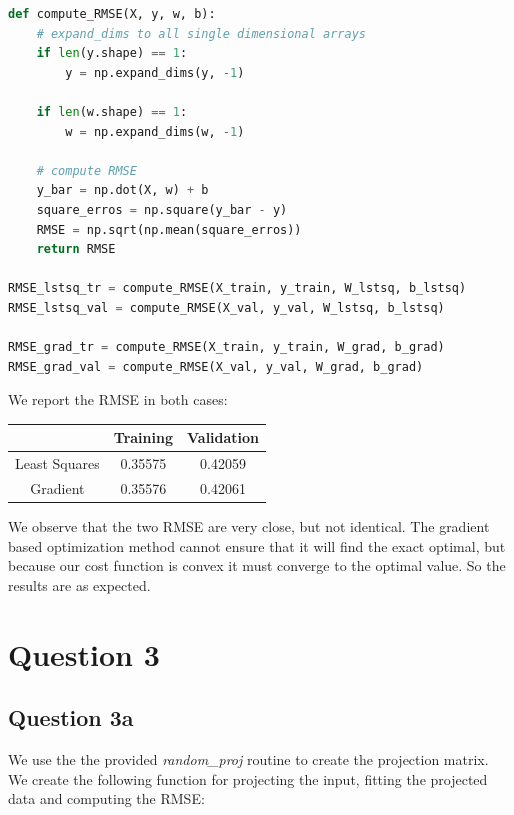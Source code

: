 \documentclass{article}
\begin{document}
\begin{lstlisting}[language= Python]
def compute_RMSE(X, y, w, b):
    # expand_dims to all single dimensional arrays
    if len(y.shape) == 1:
        y = np.expand_dims(y, -1)

    if len(w.shape) == 1:
        w = np.expand_dims(w, -1)
    
    # compute RMSE
    y_bar = np.dot(X, w) + b
    square_erros = np.square(y_bar - y)
    RMSE = np.sqrt(np.mean(square_erros))
    return RMSE 

RMSE_lstsq_tr = compute_RMSE(X_train, y_train, W_lstsq, b_lstsq)
RMSE_lstsq_val = compute_RMSE(X_val, y_val, W_lstsq, b_lstsq)

RMSE_grad_tr = compute_RMSE(X_train, y_train, W_grad, b_grad)
RMSE_grad_val = compute_RMSE(X_val, y_val, W_grad, b_grad)
\end{lstlisting}

We report the RMSE in both cases:

\begin{center}
\begin{tabular}{ | c | c | c | } 
\hline
 & Training & Validation \\
\hline
Least Squares & 0.35575 & 0.42059 \\ 
\hline
Gradient & 0.35576 & 0.42061 \\ 
\hline
\end{tabular}
\end{center}

We observe that the two RMSE are very close, but not identical. The gradient based optimization method cannot ensure that it will find the exact optimal, but because our cost function is convex it must converge to the optimal value. So the results are as expected.


\section*{Question 3}

\subsection*{Question 3a}

We use the the provided \textit{random\_proj} routine to create the projection matrix. We create the following function for projecting the input, fitting the projected data and computing the RMSE:
\end{document}

